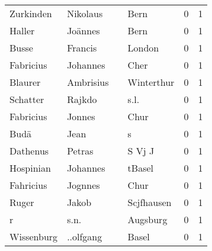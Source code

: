 \documentclass[10pt,a4paper,landscape]{article}
\begin{document}
\begin{longtable}{llllrr}
                Zurkinden &                           Nikolaus &             &                                        Bern &          0 &         1 \\
                   Haller &                            Joännes &             &                                        Bern &          0 &         1 \\
                    Busse &                            Francis &             &                                      London &          0 &         1 \\
                Fabricius &                           Johannes &             &                                        Cher &          0 &         1 \\
                  Blaurer &                          Ambrisius &             &                                  Winterthur &          0 &         1 \\
                 Schatter &                             Rajkdo &             &                                        s.l. &          0 &         1 \\
                Fabricius &                             Jonnes &             &                                        Chur &          0 &         1 \\
                     Budä &                               Jean &             &                                           s &          0 &         1 \\
                 Dathenus &                             Petras &             &                                      S Vj J &          0 &         1 \\
                Hospinian &                           Johannes &             &                                      tBasel &          0 &         1 \\
                Fahricius &                            Jognnes &             &                                        Chur &          0 &         1 \\
                    Ruger &                              Jakob &             &                                  Scjfhausen &          0 &         1 \\
                        r &                               s.n. &             &                                    Augsburg &          0 &         1 \\
               Wissenburg &                          ..olfgang &             &                                       Basel &          0 &         1 \\

\end{longtable}
\end{document}
